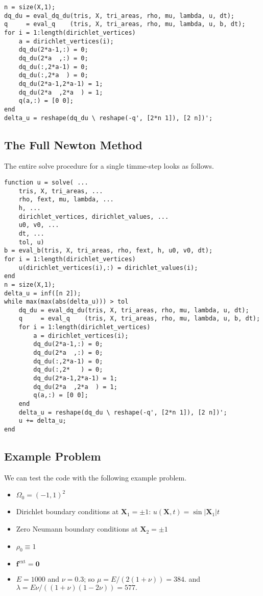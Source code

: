 \documentclass{article}
\begin{document}
\begin{verbatim}
n = size(X,1);
dq_du = eval_dq_du(tris, X, tri_areas, rho, mu, lambda, u, dt);
q     = eval_q    (tris, X, tri_areas, rho, mu, lambda, u, b, dt);
for i = 1:length(dirichlet_vertices)
    a = dirichlet_vertices(i);
    dq_du(2*a-1,:) = 0;
    dq_du(2*a  ,:) = 0;
    dq_du(:,2*a-1) = 0;
    dq_du(:,2*a  ) = 0;
    dq_du(2*a-1,2*a-1) = 1;
    dq_du(2*a  ,2*a  ) = 1;
    q(a,:) = [0 0];
end
delta_u = reshape(dq_du \ reshape(-q', [2*n 1]), [2 n])';
\end{verbatim}

\subsection{The Full Newton Method}

The entire solve procedure for a single timme-step looks as follows.

\begin{verbatim}
function u = solve( ...
    tris, X, tri_areas, ...
    rho, fext, mu, lambda, ...
    h, ...
    dirichlet_vertices, dirichlet_values, ...
    u0, v0, ...
    dt, ...
    tol, u)
b = eval_b(tris, X, tri_areas, rho, fext, h, u0, v0, dt);
for i = 1:length(dirichlet_vertices)
    u(dirichlet_vertices(i),:) = dirichlet_values(i);
end
n = size(X,1);
delta_u = inf([n 2]);
while max(max(abs(delta_u))) > tol
    dq_du = eval_dq_du(tris, X, tri_areas, rho, mu, lambda, u, dt);
    q     = eval_q    (tris, X, tri_areas, rho, mu, lambda, u, b, dt);
    for i = 1:length(dirichlet_vertices)
        a = dirichlet_vertices(i);
        dq_du(2*a-1,:) = 0;
        dq_du(2*a  ,:) = 0;
        dq_du(:,2*a-1) = 0;
        dq_du(:,2*   ) = 0;
        dq_du(2*a-1,2*a-1) = 1;
        dq_du(2*a  ,2*a  ) = 1;
        q(a,:) = [0 0];
    end
    delta_u = reshape(dq_du \ reshape(-q', [2*n 1]), [2 n])';
    u += delta_u;
end

\end{verbatim}

\subsection{Example Problem}

We can test the code with the following example problem.

\begin{itemize}
\item \(\Omega_0 = (-1,1)^2\)
\item Dirichlet boundary conditions at \(\mathbf{X}_1 = \pm 1\): \(u(\mathbf{X},t) = \sin \lvert \mathbf{X}_1 \rvert t\)
\item Zero Neumann boundary conditions at \(\mathbf{X}_2 = \pm 1\)
\item \(\rho_0 \equiv 1\)
\item \(\mathbf{f}^{\text{ext}} = \mathbf{0}\)
\item \(E = 1000\) and \(\nu = 0.3\); so \(\mu = E / (2 (1 + \nu)) = 384.\) and \(\lambda = E \nu / ((1 + \nu) (1 - 2\nu)) = 577.\)
\end{itemize}
\end{document}
